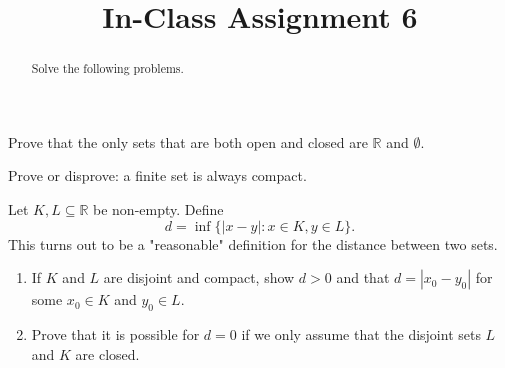 \documentclass{ximera}
\begin{document}
    \title{In-Class Assignment 6}
    \begin{abstract} Solve the following problems. \end{abstract}
    \maketitle

\begin{exercise}
    Prove that the only sets that are both open and closed are $\mathbb{R}$ and $\emptyset$.
\end{exercise}
\vfill

\begin{exercise}
    Prove or disprove: a finite set is always compact.
\end{exercise}
\vfill \newpage 
\begin{exercise}
Let $K,L \subseteq \mathbb{R}$ be non-empty. Define
$$
d=\inf \{|x-y| : x \in K, y \in L\}.
$$
This turns out to be a "reasonable" definition for the distance between two sets.
\begin{enumerate}
\item If $K$ and $L$ are disjoint and compact, show $d>0$ and that $d=|x_0-y_0|$ for some $x_0 \in K$ 
and $y_0 \in L$. 


\item Prove that it is possible for $d=0$ if we only assume that the disjoint sets $L$ and $K$ are closed.
\end{enumerate}
\end{exercise}
\end{document}
